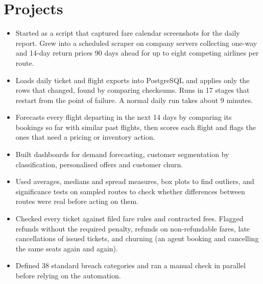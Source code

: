 \section{Projects}
\begin{itemize}
  \item Started as a script that captured fare calendar screenshots for the daily report. Grew into a scheduled scraper on company servers collecting one-way and 14-day return prices 90 days ahead for up to eight competing airlines per route.
\end{itemize}

\begin{itemize}
  \item Loads daily ticket and flight exports into PostgreSQL and applies only the rows that changed, found by comparing checksums. Runs in 17 stages that restart from the point of failure. A normal daily run takes about 9 minutes.
  \item Forecasts every flight departing in the next 14 days by comparing its bookings so far with similar past flights, then scores each flight and flags the ones that need a pricing or inventory action.
\end{itemize}

\begin{itemize}
  \item Built dashboards for demand forecasting, customer segmentation by classification, personalised offers and customer churn.
  \item Used averages, medians and spread measures, box plots to find outliers, and significance tests on sampled routes to check whether differences between routes were real before acting on them.
\end{itemize}

\begin{itemize}
  \item Checked every ticket against filed fare rules and contracted fees. Flagged refunds without the required penalty, refunds on non-refundable fares, late cancellations of issued tickets, and churning (an agent booking and cancelling the same seats again and again).
  \item Defined 38 standard breach categories and ran a manual check in parallel before relying on the automation.
\end{itemize}

